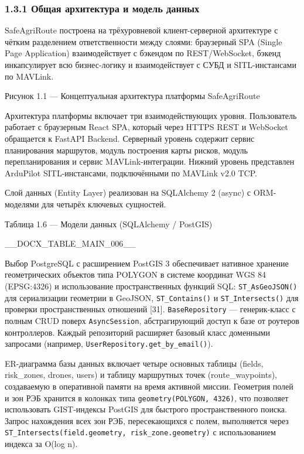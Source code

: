 \documentclass[14pt,a4paper]{extarticle}
\begin{document}
\hypertarget{ux43eux431ux449ux430ux44f-ux430ux440ux445ux438ux442ux435ux43aux442ux443ux440ux430-ux438-ux43cux43eux434ux435ux43bux44c-ux434ux430ux43dux43dux44bux445}{%
\subsubsection{1.3.1 Общая архитектура и модель данных}\label{ux43eux431ux449ux430ux44f-ux430ux440ux445ux438ux442ux435ux43aux442ux443ux440ux430-ux438-ux43cux43eux434ux435ux43bux44c-ux434ux430ux43dux43dux44bux445}}

SafeAgriRoute построена на трёхуровневой клиент-серверной архитектуре с чётким разделением ответственности между слоями: браузерный SPA (Single Page Application) взаимодействует с бэкендом по REST/WebSocket, бэкенд инкапсулирует всю бизнес-логику и взаимодействует с СУБД и SITL-инстансами по MAVLink.

Рисунок 1.1 --- Концептуальная архитектура платформы SafeAgriRoute

Архитектура платформы включает три взаимодействующих уровня. Пользователь работает с браузерным React SPA, который через HTTPS REST и WebSocket обращается к FastAPI Backend. Серверный уровень содержит сервис планирования маршрутов, модуль построения карты рисков, модуль перепланирования и сервис MAVLink-интеграции. Нижний уровень представлен ArduPilot SITL-инстансами, подключёнными по MAVLink v2.0 TCP.


Слой данных (Entity Layer) реализован на SQLAlchemy 2 (async) с ORM-моделями для четырёх ключевых сущностей.

Таблица 1.6 --- Модели данных (SQLAlchemy / PostGIS)



__DOCX_TABLE_MAIN_006__



Выбор PostgreSQL с расширением PostGIS 3 обеспечивает нативное хранение геометрических объектов типа POLYGON в системе координат WGS 84 (EPSG:4326) и использование пространственных функций SQL: \texttt{ST\_AsGeoJSON()} для сериализации геометрии в GeoJSON, \texttt{ST\_Contains()} и \texttt{ST\_Intersects()} для проверки пространственных отношений {[}31{]}. \texttt{BaseRepository} --- генерик-класс с полным CRUD поверх \texttt{AsyncSession}, абстрагирующий доступ к базе от роутеров контроллеров. Каждый репозиторий расширяет базовый класс доменными запросами (например, \texttt{UserRepository.get\_by\_email()}).

ER-диаграмма базы данных включает четыре основных таблицы (fields, risk\_zones, drones, users) и таблицу маршрутных точек (route\_waypoints), создаваемую в оперативной памяти на время активной миссии. Геометрия полей и зон РЭБ хранится в колонках типа \texttt{geometry(POLYGON,\ 4326)}, что позволяет использовать GIST-индексы PostGIS для быстрого пространственного поиска. Запрос нахождения всех зон РЭБ, пересекающихся с полем, выполняется через \texttt{ST\_Intersects(field.geometry,\ risk\_zone.geometry)} с использованием индекса за O(log n).
\end{document}
